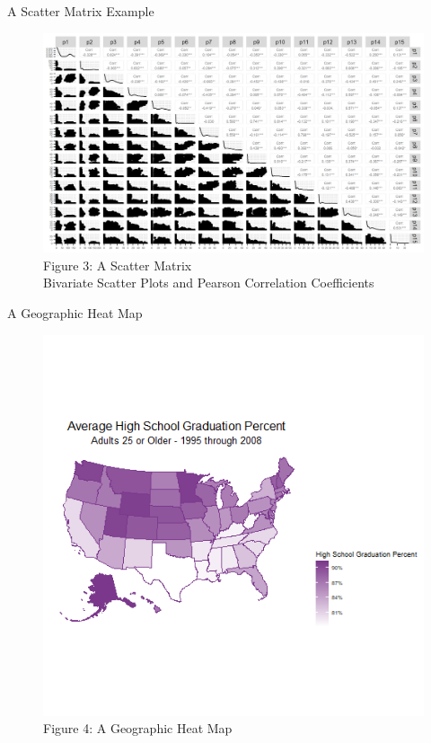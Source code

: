 \documentclass[pdf]{beamer}
\theoremstyle{remark}
\theoremstyle{definition}
\begin{document}
\begin{frame}[t]{A Scatter Matrix Example}
\begin{figure}[htbp]
  \centering
  \captionsetup{justification=centering}
  \includegraphics[clip, trim=0cm 0cm 0cm 0cm, width=1.0\textwidth]{Images/a3_q1f.png}
  \caption{Figure {\color{franklinblue} 3}: A Scatter Matrix \\ Bivariate Scatter Plots and Pearson Correlation Coefficients}
  \label{fig:scattermatrix}
\end{figure}
\end{frame}

\begin{frame}[t]{A Geographic Heat Map}
\begin{figure}[htbp]
  \centering
  \captionsetup{justification=centering}
  \includegraphics[clip, trim=0cm 3.5cm 0cm 3.5cm, width=1.0\textwidth]{Images/a7_q1d.png}
  \caption{Figure {\color{franklinblue} 4}: A Geographic Heat Map}
  \label{fig:geogheatmap}
\end{figure}
\end{frame}
\end{document}
